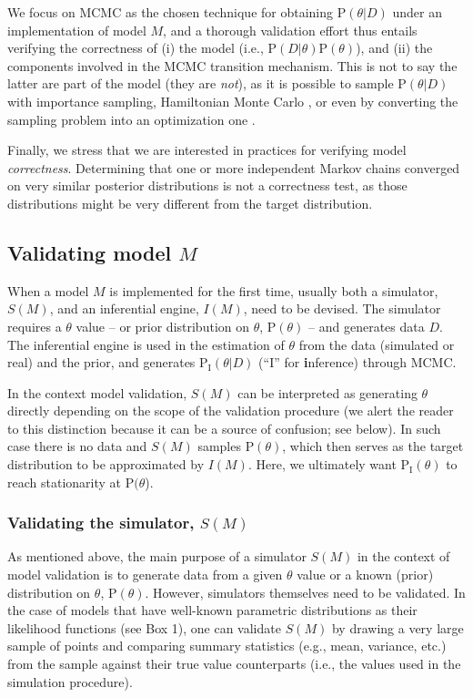 \documentclass[oneside]{article}
\begin{document}
We focus on MCMC as the chosen technique for obtaining $\text{P}(\theta|D)$
under an implementation of model $M$,
and a thorough validation effort thus entails verifying the
correctness of (i) the model (i.e., $\text{P}(D|\theta)\text{P}(\theta)$), and (ii)
the components involved in the MCMC transition mechanism.
This is not to say the latter are part of the model (they are
\emph{not}), as it is possible to sample $\text{P}(\theta|D)$ with importance sampling, Hamiltonian
Monte Carlo \citep{hmc}, or even by converting the sampling problem into an
optimization one \citep{zhang18}.

Finally, we stress that we are interested in practices for verifying model
\emph{correctness}.
Determining that one or more independent Markov chains converged on very
similar posterior distributions is not a correctness test, as those
distributions might be very different from the target distribution.

\subsection*{Validating model $M$}

When a model $M$ is implemented for the first time, usually both a
simulator, $S(M)$, and an
inferential engine, $I(M)$, need to be devised.
The simulator requires a $\theta$ value -- or prior distribution on $\theta$,
$\text{P}(\theta)$ -- and generates data $D$.
The inferential engine is used in the estimation of $\theta$ from the
data (simulated or real) and the prior, and generates
$\text{P}_{\text{I}}(\theta|D)$ (``I'' for \textbf{i}nference) through MCMC.

In the context model validation, $S(M)$ can be interpreted as generating
$\theta$ directly depending on the scope of the validation procedure
(we alert the reader to this distinction because it can be a source of
confusion; see below).
In such case there is no data and $S(M)$ samples $\text{P}(\theta)$,
which then serves as the target distribution to be approximated by
$I(M)$.
Here, we ultimately want $\text{P}_{\text{I}}(\theta)$ to reach stationarity at
$\text{P}(\theta$).

\subsubsection*{Validating the simulator,
  $S(M)$}\label{verify-correctness-of-simulator-implementation}

As mentioned above, the main purpose of a simulator $S(M)$ in the
context of model validation is to generate data from a given $\theta$
value or a known (prior) distribution on $\theta$, $\text{P}(\theta)$.
However, simulators themselves need to be validated.
In the case of models that have well-known parametric distributions as their
likelihood functions (see Box 1), one can validate $S(M)$ by
drawing a very large sample of points and comparing summary statistics
(e.g., mean, variance, etc.) from the sample against their true value
counterparts (i.e., the values used in the simulation procedure). 
\end{document}
